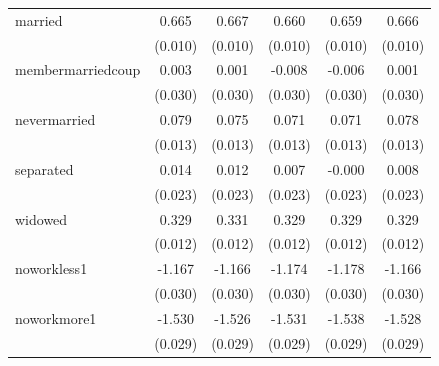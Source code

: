 \documentclass[11pt,a4paper,oldfontcommands]{memoir}
\begin{document}
{\begin{footnotesize}
\begin{tiny}
\begin{longtable}{l*{5}{c}}
married             &       0.665\sym{***}&       0.667\sym{***}&       0.660\sym{***}&       0.659\sym{***}&       0.666\sym{***}\\
                    &     (0.010)         &     (0.010)         &     (0.010)         &     (0.010)         &     (0.010)         \\
 
membermarriedcoup   &       0.003         &       0.001         &      -0.008         &      -0.006         &       0.001         \\
                    &     (0.030)         &     (0.030)         &     (0.030)         &     (0.030)         &     (0.030)         \\
 
nevermarried        &       0.079\sym{***}&       0.075\sym{***}&       0.071\sym{***}&       0.071\sym{***}&       0.078\sym{***}\\
                    &     (0.013)         &     (0.013)         &     (0.013)         &     (0.013)         &     (0.013)         \\
 
separated           &       0.014         &       0.012         &       0.007         &      -0.000         &       0.008         \\
                    &     (0.023)         &     (0.023)         &     (0.023)         &     (0.023)         &     (0.023)         \\
 
widowed             &       0.329\sym{***}&       0.331\sym{***}&       0.329\sym{***}&       0.329\sym{***}&       0.329\sym{***}\\
                    &     (0.012)         &     (0.012)         &     (0.012)         &     (0.012)         &     (0.012)         \\

noworkless1         &      -1.167\sym{***}&      -1.166\sym{***}&      -1.174\sym{***}&      -1.178\sym{***}&      -1.166\sym{***}\\
                    &     (0.030)         &     (0.030)         &     (0.030)         &     (0.030)         &     (0.030)         \\
 
noworkmore1         &      -1.530\sym{***}&      -1.526\sym{***}&      -1.531\sym{***}&      -1.538\sym{***}&      -1.528\sym{***}\\
                    &     (0.029)         &     (0.029)         &     (0.029)         &     (0.029)         &     (0.029)         \\
 

\end{longtable}
\end{tiny}
\end{footnotesize}}
\end{document}
